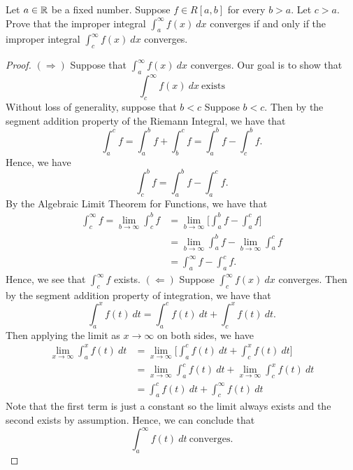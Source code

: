 \documentclass[a4paper]{article}
\begin{document}
\begin{problem}
    Let \( a \in \mathbb{R}  \) be a fixed number. Suppose \( f \in R[a,b] \) for every \( b > a  \). Let \( c > a  \). Prove that the improper integral \( \int_{ a }^{ \infty  } f(x) \ dx  \) converges if and only if the improper integral \( \int_{ c }^{ \infty  } f(x) \ dx   \) converges.
\end{problem}
\begin{proof}
    \(  (\Longrightarrow )  \) Suppose that \( \int_{ a }^{ \infty  } f(x) \ dx   \) converges. Our goal is to show that 
\[  \int_{ c }^{ \infty  } f(x)  \ dx \ \text{exists} \]
Without loss of generality, suppose that \( b < c  \)
Suppose \( b < c  \). Then by the segment addition property of the Riemann Integral, we have that 
\[  \int_{ a }^{ c } f  = \int_{ a }^{ b } f  + \int_{ b }^{ c }  f = \int_{ a }^{ b } f   - \int_{ c }^{ b } f. \]
Hence, we have 
\[  \int_{ c }^{ b } f = \int_{ a }^{ b } f - \int_{ a }^{ c } f. \]
By the Algebraic Limit Theorem for Functions, we have that 
\begin{align*}
\int_{ c  }^{ \infty  }  f   = \lim_{ b \to \infty  } \int_{ c }^{ b } f  &= \lim_{ b \to \infty  }  \Big[ \int_{ a }^{ b }  f   - \int_{ a }^{ c }  f  \Big] \\ 
                                                                          &= \lim_{ b \to \infty  }  \int_{ a }^{ b } f  - \lim_{ b \to \infty  } \int_{ a }^{ c } f \tag{ALT for Functions}  \\
                                           &= \int_{ a }^{ \infty  } f   - \int_{ a }^{ c } f.
\end{align*}
Hence, we see that \( \int_{ c }^{ \infty  } f     \) exists.     
    \( ( \Longleftarrow ) \) Suppose \( \int_{ c }^{ \infty  } f(x) \ dx   \) converges. Then by the segment addition property of integration, we have that 
    \[  \int_{ a }^{ x }  f(t) \ dt = \int_{ a }^{ c  }  f(t) \ dt + \int_{ c  }^{ x  }  f(t) \ dt.  \]
    Then applying the limit as \( x \to \infty    \) on both sides, we have 
    \begin{align*}
        \lim_{ x \to \infty  }  \int_{ a }^{ x } f(t)   \ dt &= \lim_{ x \to \infty  }  \Big[ \int_{ a }^{ c  }  f(t) \ dt + \int_{ c }^{ x  }  f(t) \ dt \Big] \\
                                                             &= \lim_{ x \to \infty  }  \int_{ a }^{ c  }  f(t) \ dt + \lim_{ x \to \infty  }  \int_{ c }^{ x }  f(t) \ dt \\
                                                             &= \int_{ a }^{ c } f(t) \ dt + \int_{ c }^{ \infty  } f(t) \ dt
    \end{align*}
    Note that the first term is just a constant so the limit always exists and the second exists by assumption. Hence, we can conclude that 
    \[  \int_{ a }^{ \infty  } f(t) \ dt \ \text{converges}. \]
\end{proof}
\end{document}
